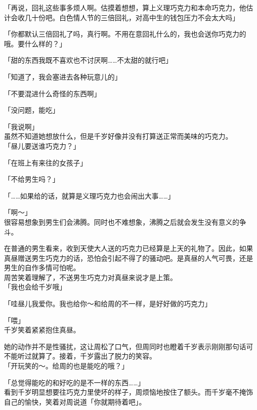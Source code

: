 「再说，回礼这些事多烦人啊。估摸着想想，算上义理巧克力和本命巧克力，他估计会收几十份吧。白色情人节的三倍回礼，对高中生的钱包压力不会太大吗」

「你都默认三倍回礼了吗，真行啊。不用在意回礼什么的，我也会送你巧克力的哦。要什么样的？」

「甜的东西我既不喜欢也不讨厌啊……不太甜的就行吧」

「知道了，我会塞进去各种玩意儿的」

「不要混进什么奇怪的东西啊」

「没问题，能吃」

「我说啊」\\

虽然不知道她想放什么，但是千岁好像并没有打算送正常而美味的巧克力。\\

「昼儿要送谁巧克力？」

「在班上有来往的女孩子」

「不给男生吗？」

「……如果给的话，就算是义理巧克力也会闹出大事……」

「啊～」\\

很容易想象到男生们会沸腾。同时也不难想象，沸腾之后就会发生没有意义的争斗。

在普通的男生看来，收到天使大人送的巧克力已经算是上天的礼物了。因此，如果真昼赠送男生巧克力的话，恐怕会引起不得了的骚动吧。是真昼的人气可畏，还是男生的自作多情可怕呢。\\

周苦笑着理解了，不送男生巧克力对真昼来说才是上策。\\

「我也会给千岁哦」

「哇昼儿我爱你。我也给你～和给周的不一样，是好好做的巧克力」

「喂」\\

千岁笑着紧紧抱住真昼。

她的动作并不是性骚扰，这让周松了口气，但周同时也瞪着千岁表示刚刚那句话可不能听过就算了。接着，千岁露出了脱力的笑容。\\

「开玩笑的～。给周的也是能吃的哦？」

「总觉得能吃的和好吃的是不一样的东西……」\\

看到千岁明显想要往巧克力里使坏的样子，周烦恼地按住了额头。而千岁毫不掩饰自己的愉快，笑着对周说道「你就期待着吧」。
